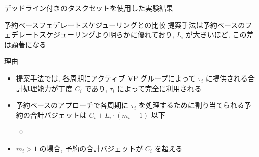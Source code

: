 \begin{frame}{デッドライン付きのタスクセットを使用した実験結果}
\end{frame}

\begin{frame}{予約ベースフェデレートスケジューリングとの比較}
    提案手法は予約ベースのフェデレートスケジューリング\cite{ueter2018reservation}より明らかに優れており, $L_{i}$ が大きいほど, この差は顕著になる
    \begin{block}{理由}
        \setlength{\linewidth}{0.98\columnwidth}
        \begin{itemize}
            \item 提案手法では, 各周期にアクティブ VP グループによって $\tau_{i}$ に提供される合計処理能力が丁度 $C_{i}$ であり, $\tau_{i}$ によって完全に利用される
            \item 予約ベースのアプローチで各周期に $\tau_{i}$ を処理するために割り当てられる予約の合計バジェットは $C_{i}+L_{i} \cdot\left(m_{i}-1\right)$ 以下
                  \begin{itemize}
                      \item {}
                  \end{itemize}
            \item $m_{i}>1$ の場合, 予約の合計バジェットが $C_{i}$ を超える
        \end{itemize}
    \end{block}
\end{frame}
